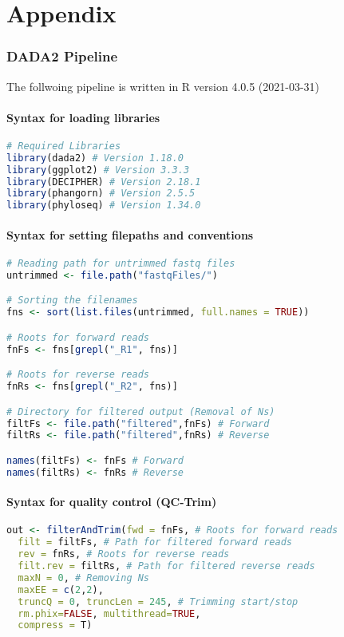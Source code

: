 \chapter*{Appendix}

 \setcounter{page}{21}

\subsection*{DADA2 Pipeline}
The follwoing pipeline is written in R version 4.0.5 (2021-03-31)

\subsubsection*{Syntax for loading libraries}

\begin{lstlisting}[language=R]
# Required Libraries
library(dada2) # Version 1.18.0
library(ggplot2) # Version 3.3.3
library(DECIPHER) # Version 2.18.1
library(phangorn) # Version 2.5.5
library(phyloseq) # Version 1.34.0
\end{lstlisting}

\subsubsection*{Syntax for setting filepaths and conventions}

\begin{lstlisting}[language=R]
# Reading path for untrimmed fastq files
untrimmed <- file.path("fastqFiles/")

# Sorting the filenames
fns <- sort(list.files(untrimmed, full.names = TRUE))

# Roots for forward reads
fnFs <- fns[grepl("_R1", fns)]

# Roots for reverse reads
fnRs <- fns[grepl("_R2", fns)]

# Directory for filtered output (Removal of Ns)
filtFs <- file.path("filtered",fnFs) # Forward
filtRs <- file.path("filtered",fnRs) # Reverse

names(filtFs) <- fnFs # Forward
names(filtRs) <- fnRs # Reverse
\end{lstlisting}

\subsubsection*{Syntax for quality control (QC-Trim)}

\begin{lstlisting}[language=R]
out <- filterAndTrim(fwd = fnFs, # Roots for forward reads
  filt = filtFs, # Path for filtered forward reads
  rev = fnRs, # Roots for reverse reads
  filt.rev = filtRs, # Path for filtered reverse reads
  maxN = 0, # Removing Ns
  maxEE = c(2,2),
  truncQ = 0, truncLen = 245, # Trimming start/stop
  rm.phix=FALSE, multithread=TRUE,
  compress = T)
\end{lstlisting}

